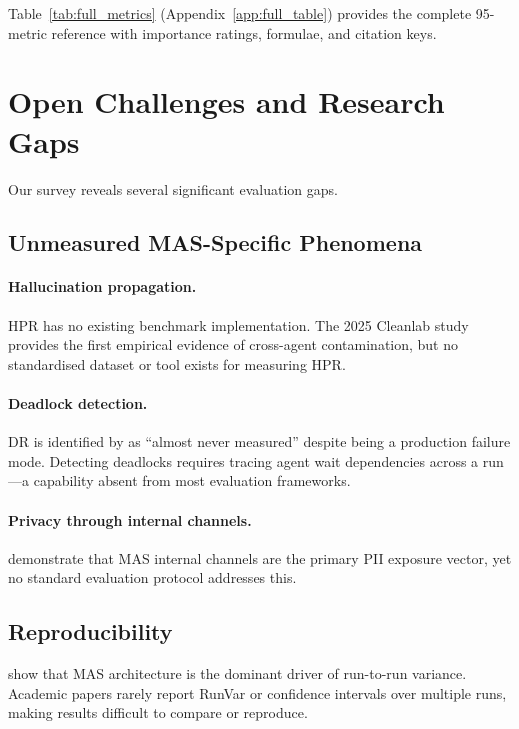 \documentclass[11pt,a4paper]{article}
\begin{document}
Table~\ref{tab:full_metrics} (Appendix~\ref{app:full_table}) provides the complete
95-metric reference with importance ratings, formulae, and citation keys.

\section{Open Challenges and Research Gaps}
\label{sec:gaps}

Our survey reveals several significant evaluation gaps.

\subsection{Unmeasured MAS-Specific Phenomena}

\paragraph{Hallucination propagation.}
HPR has no existing benchmark implementation. The 2025 Cleanlab study \citep{cleanlab2025}
provides the first empirical evidence of cross-agent contamination, but no standardised
dataset or tool exists for measuring HPR.

\paragraph{Deadlock detection.}
DR is identified by \citet{llm_eval_survey2025} as ``almost never measured'' despite
being a production failure mode. Detecting deadlocks requires tracing agent wait
dependencies across a run—a capability absent from most evaluation frameworks.

\paragraph{Privacy through internal channels.}
\citet{agentleak2025} demonstrate that MAS internal channels are the primary PII
exposure vector, yet no standard evaluation protocol addresses this.

\subsection{Reproducibility}

\citet{maestro2025} show that MAS architecture is the dominant driver of run-to-run
variance. Academic papers rarely report RunVar or confidence intervals over multiple
runs, making results difficult to compare or reproduce.
\end{document}
